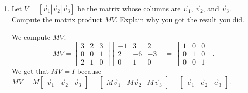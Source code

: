 \documentclass[letter]{article}
\newcommand{\mat}[1]{\begin{bmatrix}#1\end{bmatrix}}
\newenvironment{answer}{
	\begin{adjustwidth}{8mm}{} \vspace{2mm}}{\end{adjustwidth} \vspace{2mm}
}
\theoremstyle{plain}
\theoremstyle{definition}
\theoremstyle{remark}
\begin{document}
\begin{enumerate}
\begin{enumerate}
					of the problem.)
				\begin{answer}
					We row reduce
					\[
					\left[\begin{array}{ccc|c}
					3 & 2 & 3 & 1 \\
					0 & 0 & 1 & 2 \\
					2 & 1 & 0 & -1
					\end{array}\right] \sim
					\left[\begin{array}{ccc|c}
					1 & 0 & 0 & 3 \\
					0 & 1 & 1 & -7 \\
					0 & 0 & 1 & 2
					\end{array}\right].
					\]
					Therefore, we find that a solution is
					\[
					\vec{x} = \mat{3\\-7\\2} = \mat{-1\\2\\0} + 2\mat{3\\-6\\1} - \mat{2\\-3\\0},
					\]
					so then $\vec{x} = \vec{v}_1 + 2\vec{v}_2 - \vec{v}_3$.
				\end{answer}
				\item Let $V=[\vec v_1|\vec v_2|\vec v_3]$ be the matrix whose columns are $\vec v_1$, $\vec v_2$,
					and $\vec v_3$.  Compute the matrix product $MV$.  Explain why you got the
					result you did.
				\begin{answer}
					We compute $MV$. 
					\[
					MV = \left[\begin{array}{ccc}
					3 & 2 & 3\\
					0 & 0 & 1\\
					2 & 1 & 0
					\end{array}\right]
					\left[\begin{array}{ccc}
					-1 & 3 & 2\\
					2 & -6 & -3\\
					0 & 1 & 0
					\end{array}\right] = \
					\left[\begin{array}{ccc}
					1 & 0 & 0\\
					0 & 1 & 0\\
					0 & 0 & 1
					\end{array}\right].
					\]
					We get that $MV = I$ because $MV = M\mat{\vec{v}_1 & \vec{v}_2 & \vec{v}_3} = \mat{M\vec{v}_1 & M\vec{v}_2 & M\vec{v}_3} = \mat{\vec{e}_1 & \vec{e}_2 & \vec{e}_3}$. 
				\end{answer}

\end{enumerate}
\end{enumerate}
\end{document}

